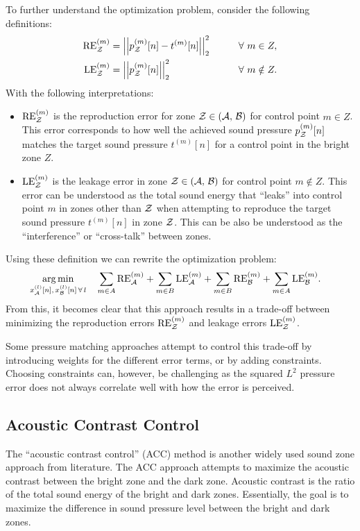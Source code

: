 To further understand the optimization problem, consider the following definitions: 
\begin{alignat}{2}
    \text{RE}^{(m)}_\zz &= \norm[2][2]{p_\zz^{(m)}[n] - t^{(m)}[n]} \qquad&& \forall\,\, m\in Z, \label{eq:sound_zone:approaches:RE}\\
    \text{LE}^{(m)}_\zz &= \norm[2][2]{p_\zz^{(m)}[n]} \qquad&& \forall\,\, m\notin Z. \label{eq:sound_zone:approaches:LE} 
\end{alignat}
With the following interpretations:
\begin{itemize}
    \item $\text{RE}^{(m)}_{\mathcal{Z}}$ is the reproduction error for zone $\mathcal{Z} \in \left(\mathcal{A},\,\mathcal{B}\right)$ 
        for control point $m \in Z$.
        This error corresponds to how well the achieved sound pressure $p_{\mathcal{Z}}^{(m)}[n]$ matches the 
        target sound pressure $t^{(m)}[n]$ for a control point in the 
        bright zone $Z$. 
    \item $\text{LE}^{(m)}_{\mathcal{Z}}$ is the leakage error in zone $\mathcal{Z} \in \left(\mathcal{A},\,\mathcal{B}\right)$ for control point $m \notin Z$.
        This error can be understood as the total sound energy that ``leaks'' into control point $m$ in zones 
        other than $\mathcal{Z}$ when attempting to reproduce the target sound pressure $t^{(m)}[n]$ in zone $\mathcal{Z}$. 
        This can be also be understood as the ``interference'' or ``cross-talk'' between zones.
\end{itemize}
Using these definition we can rewrite the optimization problem:
\begin{align}
    \operatorname*{arg\,min}_{x_{\mathcal{A}}^{(l)}[n],\,x_{\mathcal{B}}^{(l)}[n]\,\forall\,l}\quad 
       &\sum_{m\in A} \text{RE}^{(m)}_{\mathcal{A}} +  \sum_{m\in B} \text{LE}^{(m)}_{\mathcal{A}} + \sum_{m\in B} \text{RE}^{(m)}_{\mathcal{B}} + \sum_{m\in A} \text{LE}^{(m)}_{\mathcal{B}}
   .
\end{align}
From this, it becomes clear that this approach results in a trade-off between minimizing the reproduction errors $\text{RE}^{(m)}_{\mathcal{Z}}$ 
and leakage errors $\text{LE}^{(m)}_{\mathcal{Z}}$. 

Some pressure matching approaches attempt to control this trade-off by introducing weights for the different error terms, 
or by adding constraints.
Choosing constraints can, however, be challenging as the squared $L^2$ pressure error does not always correlate well with how
the error is perceived.

\subsection{Acoustic Contrast Control}
\label{ch:sound_zone:approaches:acoustic_contrast_control}
The ``acoustic contrast control'' (ACC) method is another widely used sound zone approach from literature.
The ACC approach attempts to maximize the acoustic contrast between the bright zone and the dark zone. 
Acoustic contrast is the ratio of the total sound energy of the bright and dark zones.
Essentially, the goal is to maximize the difference in sound pressure level between the bright and dark zones.


